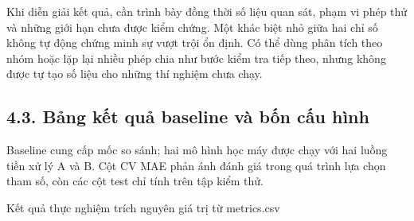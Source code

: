 \documentclass[12pt,a4paper,oneside]{article}
\begin{document}
Khi diễn giải kết quả, cần trình bày đồng thời số liệu quan sát, phạm vi phép thử và những giới hạn chưa được kiểm chứng. Một khác biệt nhỏ giữa hai chỉ số không tự động chứng minh sự vượt trội ổn định. Có thể dùng phân tích theo nhóm hoặc lặp lại nhiều phép chia như bước kiểm tra tiếp theo, nhưng không được tự tạo số liệu cho những thí nghiệm chưa chạy.\par

\subsection*{4.3. Bảng kết quả baseline và bốn cấu hình}

Baseline cung cấp mốc so sánh; hai mô hình học máy được chạy với hai
luồng tiền xử lý A và B. Cột CV MAE phản ánh đánh giá trong quá trình
lựa chọn tham số, còn các cột test chỉ tính trên tập kiểm thử.

Kết quả thực nghiệm trích nguyên giá trị từ metrics.csv
\end{document}
